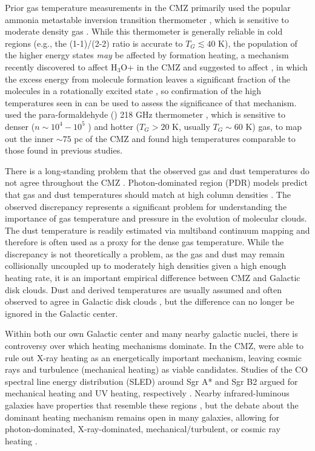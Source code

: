 Prior gas temperature measurements in the CMZ primarily used the popular
ammonia metastable inversion transition thermometer \citep[\ammonia (1,1) -
(7, 7);][]{Guesten1981a, Mauersberger1986a, Huettemeister1993a, Ott2014a},
which is
sensitive to moderate density gas \citep[$n(\hh) \sim 10^3-10^4$
\percc;][]{Shirley2015a}.  While this thermometer is generally reliable in cold
regions (e.g., the (1-1)/(2-2) ratio is accurate to $T_G\lesssim40$ K), the
population of the higher energy states \emph{may} be affected by formation
heating, a mechanism recently discovered to affect H$_3$O+ in the CMZ and
suggested to affect \ammonia, in which the excess energy from molecule
formation leaves a significant fraction of the molecules in a rotationally
excited state \citep[][]{Lis2014a}, so confirmation of the high temperatures
seen in \ammonia \citep{Mills2013a} can be used to assess the significance of
that mechanism.  \citet{Ao2013a} used the para-formaldehyde (\para) 218 GHz
thermometer \citep{Mangum1993a}, which is sensitive to denser ($n\sim10^4-10^5$
\percc) and hotter ($T_G>20$ K, usually $T_G\sim60$ K) gas, to map out the
inner $\sim75$ pc of the CMZ and found high temperatures comparable to those
found in previous studies.

There is a long-standing problem that the observed gas and dust temperatures do
not agree throughout the CMZ \citep{Guesten1981a, Molinari2011a, Ao2013a,
Clark2013a, Ott2014a}.  Photon-dominated region
(PDR) models predict that gas and dust temperatures should match at high column
densities
\citep{Hollenbach1999a}.  The observed discrepancy represents a significant
problem for understanding the importance of gas temperature and pressure in the
evolution of molecular clouds.  The dust temperature is readily estimated via
multiband continuum mapping and therefore is often used as a proxy for the
dense gas temperature.  While the discrepancy is not theoretically a problem,
as the gas and dust may remain collisionally uncoupled up to moderately high
densities given a high enough heating rate, it is an important empirical
difference between CMZ and Galactic disk clouds.  Dust and \ammonia derived
temperatures are usually assumed and often observed to agree in Galactic disk
clouds \citep{Pillai2006a, Dunham2010a, Juvela2012a, Battersby2014a},  but the
difference can no longer be ignored in the Galactic center.

Within both our own Galactic center and many nearby galactic nuclei, there is
controversy over which heating mechanisms dominate.  In the CMZ,
\citet{Ao2013a} were able to rule out X-ray heating as an energetically
important mechanism, leaving cosmic rays and turbulence (mechanical heating) as
viable candidates.  Studies of the CO spectral line energy distribution (SLED)
around Sgr A* and Sgr B2 argued for mechanical heating and UV heating,
respectively \citep{Goicoechea2013a,Etxaluze2013a}.  Nearby infrared-luminous
galaxies have properties that resemble these regions
\citep{Kamenetzky2012a,Kamenetzky2014a}, but the debate about the dominant
heating mechanism remains open in many galaxies, allowing for photon-dominated,
X-ray-dominated, mechanical/turbulent, or cosmic ray heating
\citep{Loenen2008a, van-der-Werf2010a, Papadopoulos2011a, Meijerink2011a,
Bayet2011a, Mangum2013a, Papadopoulos2013a}.

